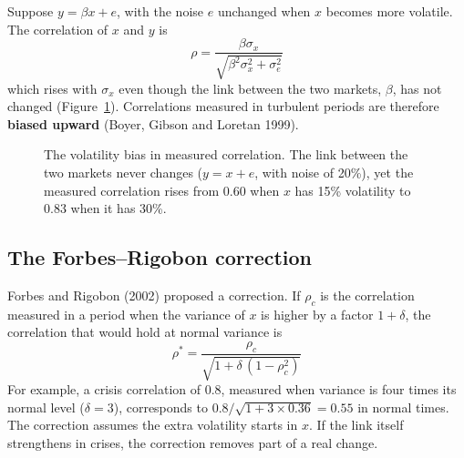 Suppose $y = \beta x + e$, with the noise $e$ unchanged when $x$ becomes more volatile. The correlation of $x$ and $y$ is
\begin{equation}
  \rho = \frac{\beta\sigma_x}{\sqrt{\beta^2\sigma_x^2 + \sigma_e^2}}
  \label{eq:13-bias}
\end{equation}
which rises with $\sigma_x$ even though the link between the two markets, $\beta$, has not changed (Figure~\ref{fig:13-bias}). Correlations measured in turbulent periods are therefore \textbf{biased upward} (Boyer, Gibson and Loretan 1999).

\begin{figure}[htbp]
\centering
{}
\caption{The volatility bias in measured correlation. The link between the two markets never changes ($y = x + e$, with noise of 20\%), yet the measured correlation rises from 0.60 when $x$ has 15\% volatility to 0.83 when it has 30\%.}
\label{fig:13-bias}
\end{figure}

\subsection{The Forbes--Rigobon correction}

Forbes and Rigobon (2002) proposed a correction. If $\rho_c$ is the correlation measured in a period when the variance of $x$ is higher by a factor $1 + \delta$, the correlation that would hold at normal variance is
\begin{equation}
  \rho^* = \frac{\rho_c}{\sqrt{1 + \delta\,(1 - \rho_c^2)}}
  \label{eq:13-fr}
\end{equation}
For example, a crisis correlation of 0.8, measured when variance is four times its normal level ($\delta = 3$), corresponds to $0.8/\sqrt{1 + 3 \times 0.36} = 0.55$ in normal times. The correction assumes the extra volatility starts in $x$. If the link itself strengthens in crises, the correction removes part of a real change.

